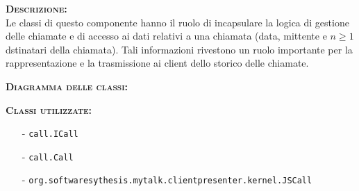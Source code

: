 \begin{description}
  \item{\scshape\bfseries Descrizione:}\\
Le classi di questo componente hanno il ruolo di incapsulare la logica di gestione delle chiamate e di accesso ai dati relativi a una chiamata (data, mittente e $n\geq1$ dstinatari della chiamata). Tali informazioni rivestono un ruolo importante per la rappresentazione e la trasmissione ai client dello storico delle chiamate.
  \item{\scshape\bfseries Diagramma delle classi:}

  \item{\scshape\bfseries Classi utilizzate:}\\
  \begin{itemize}[noitemsep,nolistsep]
    \item[-] \texttt{call.ICall}
    \item[-] \texttt{call.Call}
    \item[-] \texttt{org.softwaresythesis.mytalk.clientpresenter.kernel.JSCall}
  \end{itemize}
\end{description}

